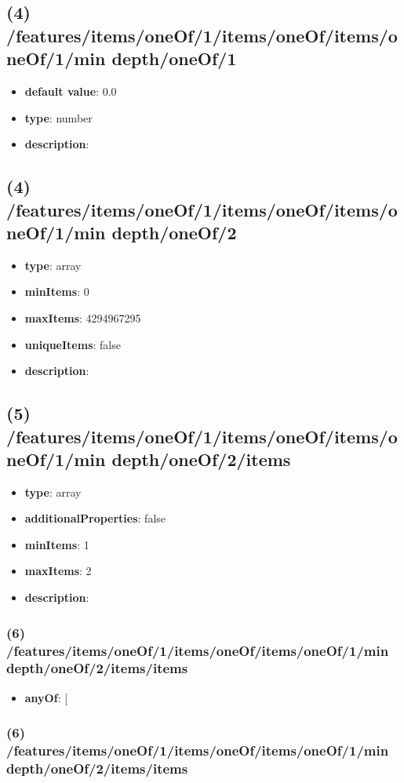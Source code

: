 \subsection{(4) /features/items/oneOf/1/items/oneOf/items/oneOf/1/min depth/oneOf/1}
\begin{itemize}[leftmargin=4em]\item {\bf default value}: 0.0
\item {\bf type}: number
\item {\bf description}: 
\end{itemize}\subsection{(4) /features/items/oneOf/1/items/oneOf/items/oneOf/1/min depth/oneOf/2}
\begin{itemize}[leftmargin=4em]\item {\bf type}: array
\item {\bf minItems}: 0
\item {\bf maxItems}: 4294967295
\item {\bf uniqueItems}: false
\item {\bf description}: 
\end{itemize}\subsection{(5) /features/items/oneOf/1/items/oneOf/items/oneOf/1/min depth/oneOf/2/items}
\begin{itemize}[leftmargin=5em]\item {\bf type}: array
\item {\bf additionalProperties}: false
\item {\bf minItems}: 1
\item {\bf maxItems}: 2
\item {\bf description}: 
\end{itemize}\subsubsection{(6) /features/items/oneOf/1/items/oneOf/items/oneOf/1/min depth/oneOf/2/items/items}
\begin{itemize}[leftmargin=6em]\item {\bf anyOf}: [\end{itemize}\subsubsection{(6) /features/items/oneOf/1/items/oneOf/items/oneOf/1/min depth/oneOf/2/items/items}
